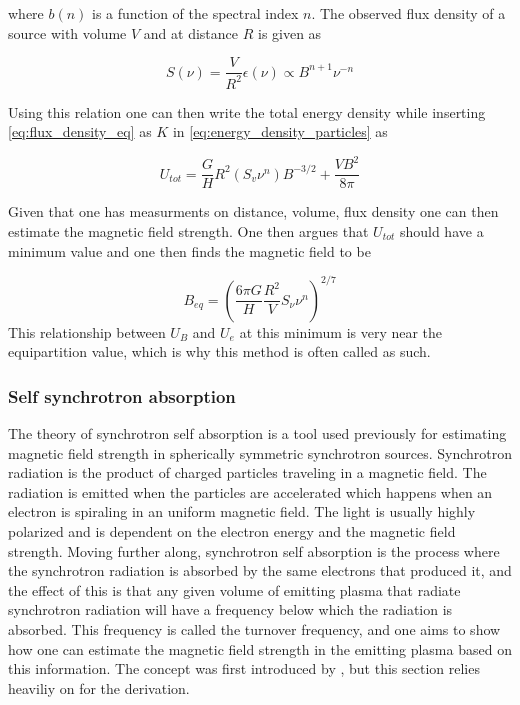 where $b(n)$ is a function of the spectral index $n$. The observed flux density of a source with volume $V$  and at distance $R$ is given as 

\begin{equation}
    \label{eq:flux_density_eq}
    S(\nu) = \frac{V}{R^2} \epsilon(\nu) \propto B^{n+1} \nu^{-n}
\end{equation}

Using this relation one can then write the total energy density while inserting \ref{eq:flux_density_eq} as $K$ in \ref{eq:energy_density_particles} as

\begin{equation}
    U_{tot} = \frac{G}{H}R^2(S_v\nu^n)B^{-3/2} + \frac{V B^2}{8\pi}
\end{equation}

Given that one has measurments on distance, volume, flux density one can then estimate the magnetic field strength. One then argues that $U_{tot}$ should have a minimum value and one then finds the magnetic field to be 

\begin{equation}
    B_{eq} = \left(\frac{6\pi G}{H}\frac{R^2}{V}S_\nu \nu^n\right)^{2/7}
\end{equation}
This relationship between $U_B$ and $U_e$  at this minimum is very near the equipartition value, which is why this method is often called as such.

\subsubsection{Self synchrotron absorption}


The theory of synchrotron self absorption is a tool used previously for estimating magnetic field strength in spherically symmetric synchrotron sources. Synchrotron radiation is the product of charged particles traveling in a magnetic field. The radiation is emitted when the particles are accelerated which happens when an electron is spiraling in an uniform magnetic field. The light is usually highly polarized and is dependent on the electron energy and the magnetic field strength. Moving further along, synchrotron self absorption is the process where the synchrotron radiation is absorbed by the same electrons that produced it, and the effect of this is that any given volume of emitting plasma that radiate synchrotron radiation will have a frequency below which the radiation is absorbed. This frequency is called the turnover frequency, and one aims to show how one can estimate the magnetic field strength in the emitting plasma based on this information. The concept was first introduced by \cite{1983ApJ...264..296M}, but this section relies heaviliy on \cite{Hirotani_2005} for the derivation. 

